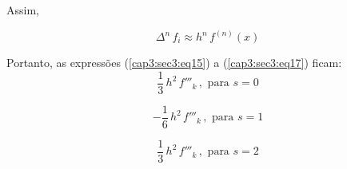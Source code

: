 Assim,

\begin{equation}
 \label{cap3:sec3:eq19}
 \Delta^n\,f_i \approx h^n \, f^{(n)}(x)
\end{equation}

Portanto, as expressões (\ref{cap3:sec3:eq15}) a (\ref{cap3:sec3:eq17}) ficam:
\[
 \displaystyle \frac{1}{3}\,h^{2}\,f'''_{k}\,, \mbox{ para } s = 0
\]

\[
 \displaystyle -\frac{1}{6}\,h^{2}\,f'''_{k}\,, \mbox{ para } s = 1
\]

\[
 \displaystyle \frac{1}{3}\,h^{2}\,f'''_{k}\,, \mbox{ para } s = 2
\]

